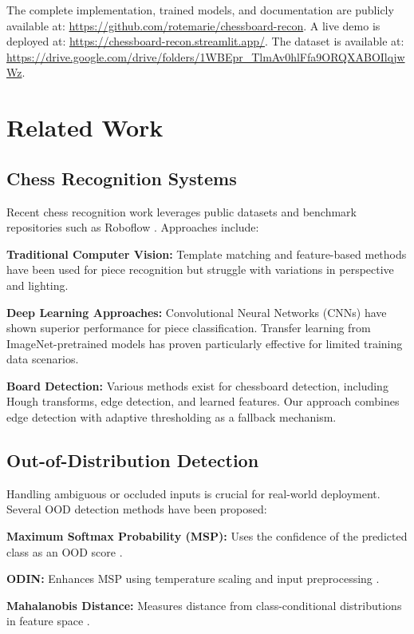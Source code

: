 \documentclass[conference]{IEEEtran}
\begin{document}
The complete implementation, trained models, and documentation are publicly available at: \url{https://github.com/rotemarie/chessboard-recon}. A live demo is deployed at: \url{https://chessboard-recon.streamlit.app/}. The dataset is available at: \url{https://drive.google.com/drive/folders/1WBEpr_TlmAv0hlFfa9ORQXABOIlqjwWz}.

\section{Related Work}

\subsection{Chess Recognition Systems}

Recent chess recognition work leverages public datasets and benchmark repositories such as Roboflow \cite{roboflow}. Approaches include:

\textbf{Traditional Computer Vision:} Template matching and feature-based methods have been used for piece recognition but struggle with variations in perspective and lighting.

\textbf{Deep Learning Approaches:} Convolutional Neural Networks (CNNs) have shown superior performance for piece classification. Transfer learning from ImageNet-pretrained models has proven particularly effective for limited training data scenarios.

\textbf{Board Detection:} Various methods exist for chessboard detection, including Hough transforms, edge detection, and learned features. Our approach combines edge detection with adaptive thresholding as a fallback mechanism.

\subsection{Out-of-Distribution Detection}

Handling ambiguous or occluded inputs is crucial for real-world deployment. Several OOD detection methods have been proposed:

\textbf{Maximum Softmax Probability (MSP):} Uses the confidence of the predicted class as an OOD score \cite{hendrycks2017baseline}.

\textbf{ODIN:} Enhances MSP using temperature scaling and input preprocessing \cite{liang2018enhancing}.

\textbf{Mahalanobis Distance:} Measures distance from class-conditional distributions in feature space \cite{lee2018simple}.
\end{document}
